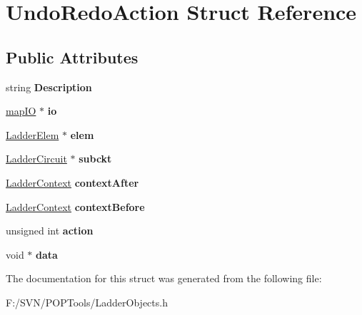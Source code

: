 \hypertarget{struct_undo_redo_action}{\section{Undo\-Redo\-Action Struct Reference}
\label{struct_undo_redo_action}
}
\subsection*{Public Attributes}
\begin{DoxyCompactItemize}
\item 
\hypertarget{struct_undo_redo_action_ab79813d6b0d719283f76d882ad7fcb11}{string {\bfseries Description}}\label{struct_undo_redo_action_ab79813d6b0d719283f76d882ad7fcb11}

\item 
\hypertarget{struct_undo_redo_action_af8abee0ad0bd83c4c467493f95df6e43}{\hyperlink{classmap_i_o}{map\-I\-O} $\ast$ {\bfseries io}}\label{struct_undo_redo_action_af8abee0ad0bd83c4c467493f95df6e43}

\item 
\hypertarget{struct_undo_redo_action_aa24fe21eb25fb93d8d0021b7a1e75cc1}{\hyperlink{class_ladder_elem}{Ladder\-Elem} $\ast$ {\bfseries elem}}\label{struct_undo_redo_action_aa24fe21eb25fb93d8d0021b7a1e75cc1}

\item 
\hypertarget{struct_undo_redo_action_a805d9a9a358a921532af7e223d0e396b}{\hyperlink{class_ladder_circuit}{Ladder\-Circuit} $\ast$ {\bfseries subckt}}\label{struct_undo_redo_action_a805d9a9a358a921532af7e223d0e396b}

\item 
\hypertarget{struct_undo_redo_action_a437e3f7a42f136c9ba782f247262f318}{\hyperlink{struct_ladder_context}{Ladder\-Context} {\bfseries context\-After}}\label{struct_undo_redo_action_a437e3f7a42f136c9ba782f247262f318}

\item 
\hypertarget{struct_undo_redo_action_aa93c7e8be96fcbf7f1c488b83e1bf5c1}{\hyperlink{struct_ladder_context}{Ladder\-Context} {\bfseries context\-Before}}\label{struct_undo_redo_action_aa93c7e8be96fcbf7f1c488b83e1bf5c1}

\item 
\hypertarget{struct_undo_redo_action_ade3ff6c448a18adf54de0ce8c466be4b}{unsigned int {\bfseries action}}\label{struct_undo_redo_action_ade3ff6c448a18adf54de0ce8c466be4b}

\item 
\hypertarget{struct_undo_redo_action_a06d3ec9212fea009419ce5301dbd4cfd}{void $\ast$ {\bfseries data}}\label{struct_undo_redo_action_a06d3ec9212fea009419ce5301dbd4cfd}

\end{DoxyCompactItemize}


The documentation for this struct was generated from the following file\-:\begin{DoxyCompactItemize}
\item 
F\-:/\-S\-V\-N/\-P\-O\-P\-Tools/Ladder\-Objects.\-h\end{DoxyCompactItemize}
